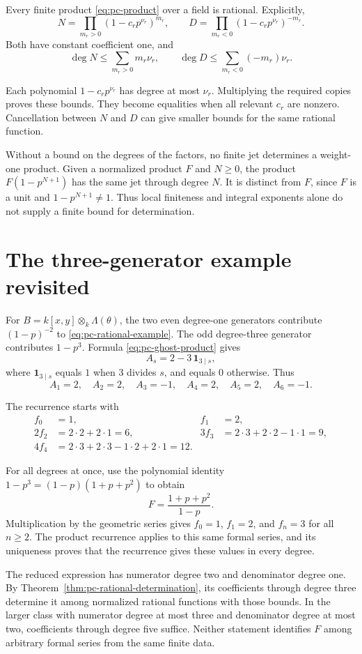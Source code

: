 Every finite product \eqref{eq:pc-product} over a field is rational.
Explicitly,
\[
 N=\prod_{m_r>0}(1-c_rp^{\nu_r})^{m_r},\qquad
 D=\prod_{m_r<0}(1-c_rp^{\nu_r})^{-m_r}.
\]
Both have constant coefficient one, and
\[
 \deg N\leq\sum_{m_r>0}m_r\nu_r,\qquad
 \deg D\leq\sum_{m_r<0}(-m_r)\nu_r.
\]

Each polynomial $1-c_rp^{\nu_r}$ has degree at most $\nu_r$.
Multiplying the required copies proves these bounds.
They become equalities when all relevant $c_r$ are
nonzero. Cancellation between $N$ and $D$ can give smaller bounds for the
same rational function.

Without a bound on the degrees of the factors, no finite jet determines
a weight-one product. Given a normalized product $F$ and $N\geq0$,
the product $F(1-p^{N+1})$ has the same jet through degree $N$.
It is distinct from $F$, since $F$ is a unit and $1-p^{N+1}\ne1$.
Thus local finiteness and integral exponents alone do not supply a
finite bound for determination.

\section{The three-generator example revisited}

For $B=k[x,y]\otimes_k\Lambda(\theta)$, the two even degree-one generators
contribute $(1-p)^{-2}$ to \eqref{eq:pc-rational-example}.
The odd degree-three generator contributes $1-p^3$.
Formula \eqref{eq:pc-ghost-product} gives
\[
 A_s=2-3\,\mathbf1_{3\mid s},
\]
where $\mathbf1_{3\mid s}$ equals $1$ when $3$ divides $s$, and equals $0$
otherwise. Thus
\[
 A_1=2,\quad A_2=2,\quad A_3=-1,\quad A_4=2,\quad A_5=2,\quad A_6=-1.
\]

The recurrence starts with
\begin{align*}
 f_0&=1,& f_1&=2,\\
 2f_2&=2\cdot2+2\cdot1=6,&
 3f_3&=2\cdot3+2\cdot2-1\cdot1=9,\\
 4f_4&=2\cdot3+2\cdot3-1\cdot2+2\cdot1=12.
\end{align*}

For all degrees at once, use the polynomial identity
$1-p^3=(1-p)(1+p+p^2)$ to obtain
\[
 F=\frac{1+p+p^2}{1-p}.
\]
Multiplication by the geometric series gives $f_0=1$, $f_1=2$, and
$f_n=3$ for all $n\geq2$. The product recurrence applies to this same
formal series, and its uniqueness proves that the recurrence gives these
values in every degree.

The reduced expression has numerator degree two and denominator degree
one. By Theorem~\ref{thm:pc-rational-determination}, its coefficients
through degree three determine it among normalized rational functions
with those bounds. In the larger class with numerator degree at most
three and denominator degree at most two, coefficients through degree
five suffice. Neither statement identifies $F$ among arbitrary formal
series from the same finite data.

